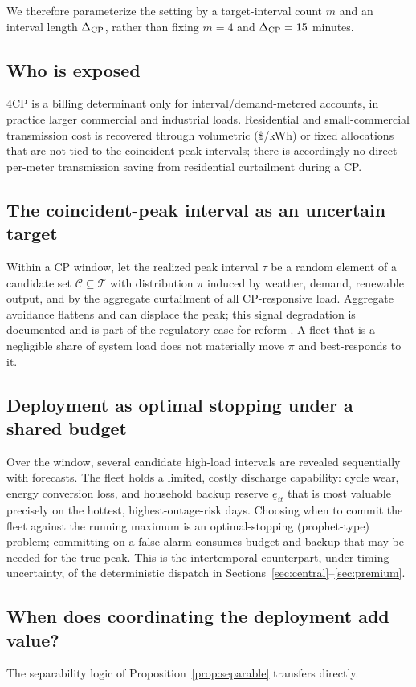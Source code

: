 \documentclass[11pt]{article}
\theoremstyle{remark}
\newcommand{\T}{\mathcal T}
\begin{document}
We therefore parameterize the setting by
a target-interval count $m$ and an interval length $\Delta_{\rm CP}$, rather
than fixing $m=4$ and $\Delta_{\rm CP}=15$ minutes.

\subsection{Who is exposed}
4CP is a billing determinant only for interval/demand-metered accounts, in
practice larger commercial and industrial loads. Residential and
small-commercial transmission cost is recovered through volumetric
(\$/kWh) or fixed allocations that are not tied to the coincident-peak
intervals; there is accordingly no direct per-meter transmission saving from
residential curtailment during a CP.

\subsection{The coincident-peak interval as an uncertain target}
Within a CP window, let the realized peak interval $\tau$ be a random element
of a candidate set $\mathcal C\subseteq\T$ with distribution $\pi$ induced by
weather, demand, renewable output, and by the aggregate
curtailment of all CP-responsive load. Aggregate avoidance flattens and can
displace the peak; this signal degradation is documented and is part of the
regulatory case for reform \cite{nrg,rtoinsider}. A fleet that is a negligible
share of system load does not materially move $\pi$ and best-responds to
it. 

\subsection{Deployment as optimal stopping under a shared budget}
Over the window, several candidate high-load intervals are revealed
sequentially with forecasts. The fleet holds a limited, costly discharge
capability: cycle wear, energy conversion loss, and household backup reserve
$\underline e_{it}$ that is most valuable precisely on the hottest,
highest-outage-risk days. Choosing when to commit the fleet against the running
maximum is an optimal-stopping (prophet-type) problem; committing on a false
alarm consumes budget and backup that may be needed for the true peak. This is
the intertemporal counterpart, under timing uncertainty, of the deterministic
dispatch in Sections~\ref{sec:central}--\ref{sec:premium}.

\subsection{When does coordinating the deployment add value?}
The separability logic of Proposition~\ref{prop:separable} transfers directly.
\end{document}
